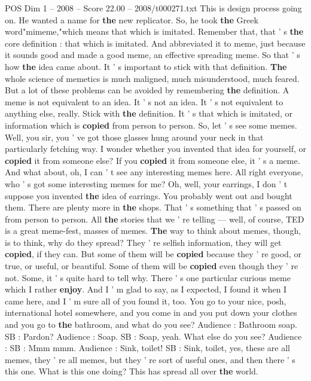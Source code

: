 \begin{textsample}{POS Dim 1 – 2008 – Score 22.00 – 2008/t000271.txt}
This is design process going on.
He wanted a name for \textbf{the} new replicator.
So, he took \textbf{the} Greek word"mimeme,"which means that which is imitated.
Remember that, that ' s \textbf{the} core definition : that which is imitated.
And abbreviated it to meme, just because it sounds good and made a good meme, an effective spreading meme.
So that ' s how \textbf{the} idea came about.
It ' s important to stick with that definition. \textbf{The} whole science of memetics is much maligned, much misunderstood, much feared.
But a lot of these problems can be avoided by remembering \textbf{the} definition.
A meme is not equivalent to an idea.
It ' s not an idea.
It ' s not equivalent to anything else, really.
Stick with \textbf{the} definition.
It ' s that which is imitated, or information which is \textbf{copied} from person to person.
So, let ' s see some memes.
Well, you sir, you ' ve got those glasses hung around your neck in that particularly fetching way.
I wonder whether you invented that idea for yourself, or \textbf{copied} it from someone else?
If you \textbf{copied} it from someone else, it ' s a meme.
And what about, oh, I can ' t see any interesting memes here.
All right everyone, who ' s got some interesting memes for me?
Oh, well, your earrings, I don ' t suppose you invented \textbf{the} idea of earrings.
You probably went out and bought them.
There are plenty more in \textbf{the} shops.
That ' s something that ' s passed on from person to person.
All \textbf{the} stories that we ' re telling — well, of course, TED is a great meme-fest, masses of memes. \textbf{The} way to think about memes, though, is to think, why do they spread?
They ' re selfish information, they will get \textbf{copied}, if they can.
But some of them will be \textbf{copied} because they ' re good, or true, or useful, or beautiful.
Some of them will be \textbf{copied} even though they ' re not.
Some, it ' s quite hard to tell why.
There ' s one particular curious meme which I rather \textbf{enjoy}.
And I ' m glad to say, as I expected, I found it when I came here, and I ' m sure all of you found it, too.
You go to your nice, posh, international hotel somewhere, and you come in and you put down your clothes and you go to \textbf{the} bathroom, and what do you see?
Audience : Bathroom soap.
SB : Pardon?
Audience : Soap.
SB : Soap, yeah.
What else do you see?
Audience : SB : Mmm mmm.
Audience : Sink, toilet!
SB : Sink, toilet, yes, these are all memes, they ' re all memes, but they ' re sort of useful ones, and then there ' s this one.
What is this one doing?
This has spread all over \textbf{the} world.

\end{textsample}
